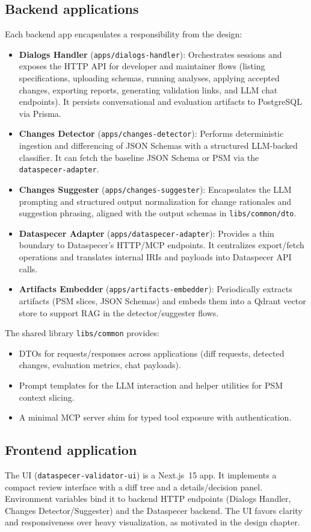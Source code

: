 \subsection*{Backend applications}
Each backend app encapsulates a responsibility from the design:
\begin{itemize}
  \item \textbf{Dialogs Handler} (\texttt{apps/dialogs-handler}): Orchestrates sessions and exposes the HTTP API for developer and maintainer flows (listing specifications, uploading schemas, running analyses, applying accepted changes, exporting reports, generating validation links, and LLM chat endpoints). It persists conversational and evaluation artifacts to PostgreSQL via Prisma.
  \item \textbf{Changes Detector} (\texttt{apps/changes-detector}): Performs deterministic ingestion and differencing of JSON Schemas with a structured LLM-backed classifier. It can fetch the baseline JSON Schema or PSM via the \texttt{dataspecer-adapter}.
  \item \textbf{Changes Suggester} (\texttt{apps/changes-suggester}): Encapsulates the LLM prompting and structured output normalization for change rationales and suggestion phrasing, aligned with the output schemas in \texttt{libs/common/dto}.
  \item \textbf{Dataspecer Adapter} (\texttt{apps/dataspecer-adapter}): Provides a thin boundary to Dataspecer’s HTTP/MCP endpoints. It centralizes export/fetch operations and translates internal IRIs and payloads into Dataspecer API calls.
  \item \textbf{Artifacts Embedder} (\texttt{apps/artifacts-embedder}): Periodically extracts artifacts (PSM slices, JSON Schemas) and embeds them into a Qdrant vector store to support RAG in the detector/suggester flows.
\end{itemize}
The shared library \texttt{libs/common} provides:
\begin{itemize}
  \item DTOs for requests/responses across applications (diff requests, detected changes, evaluation metrics, chat payloads).
  \item Prompt templates for the LLM interaction and helper utilities for PSM context slicing.
  \item A minimal MCP server shim for typed tool exposure with authentication.
\end{itemize}

\subsection*{Frontend application}
The UI (\texttt{dataspecer-validator-ui}) is a Next.js~15 app. It implements a compact
review interface with a diff tree and a details/decision panel. Environment variables
bind it to backend HTTP endpoints (Dialogs Handler, Changes Detector/Suggester) and the
Dataspecer backend. The UI favors clarity and responsiveness over heavy visualization,
as motivated in the design chapter.


